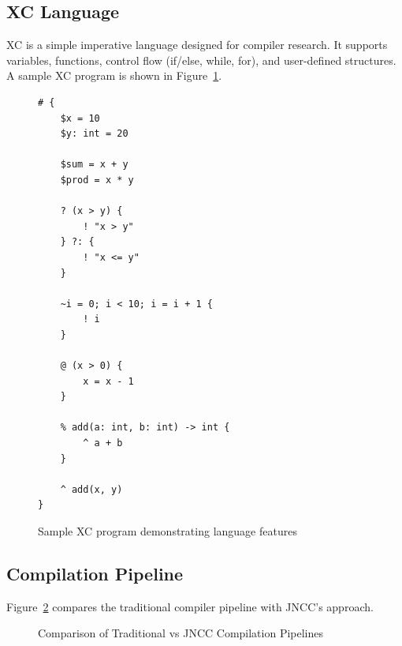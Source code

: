 \documentclass[12pt, a4paper, submitted, nofoot]{JNCCtemplate}
\begin{document}
\subsection{XC Language}

XC is a simple imperative language designed for compiler research. It supports variables, functions, control flow (if/else, while, for), and user-defined structures. A sample XC program is shown in Figure~\ref{fig:xc_example}.

\begin{figure}[h]
\begin{lstlisting}[style=xcstyle]
# {
    $x = 10
    $y: int = 20

    $sum = x + y
    $prod = x * y

    ? (x > y) {
        ! "x > y"
    } ?: {
        ! "x <= y"
    }

    ~i = 0; i < 10; i = i + 1 {
        ! i
    }

    @ (x > 0) {
        x = x - 1
    }

    % add(a: int, b: int) -> int {
        ^ a + b
    }

    ^ add(x, y)
}
\end{lstlisting}
\caption{Sample XC program demonstrating language features}
\label{fig:xc_example}
\end{figure}

\subsection{Compilation Pipeline}

Figure~\ref{fig:pipeline} compares the traditional compiler pipeline with JNCC's approach.

\begin{figure}[h]
\centering
{}
\caption{Comparison of Traditional vs JNCC Compilation Pipelines}
\label{fig:pipeline}
\end{figure}
\end{document}

